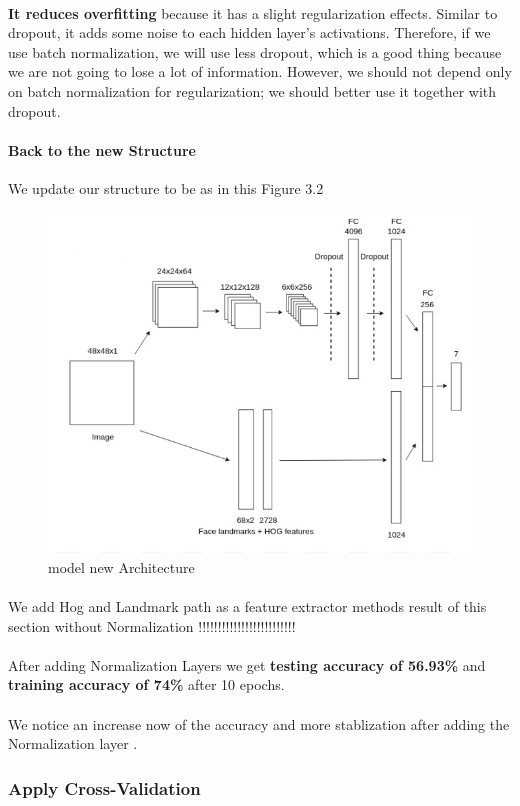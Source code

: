 \paragraph{}
\textbf{It reduces overfitting}
because it has a slight regularization effects. Similar to dropout, it adds some noise to each hidden layer’s activations. Therefore, if we use batch normalization, we will use less dropout, which is a good thing because we are not going to lose a lot of information. However, we should not depend only on batch normalization for regularization; we should better use it together with dropout.
\paragraph{Back to the new Structure}
We update our structure to be as in this Figure 3.2
\begin{figure}
	\centering
	\includegraphics[width=.5\textwidth]{Arch.png}
	\caption{model new Architecture}
\end{figure} 
\paragraph{}
We add Hog and Landmark path as a feature extractor methods 
result of this section without Normalization
!!!!!!!!!!!!!!!!!!!!!!!!!
\paragraph{}
After adding Normalization Layers we get \textbf{testing accuracy of 56.93\%} and \textbf{training accuracy of 74\%} after 10 epochs. 
\paragraph{}
We notice an increase now of the accuracy and more stablization after adding the Normalization layer .
\subsubsection{Apply Cross-Validation}
